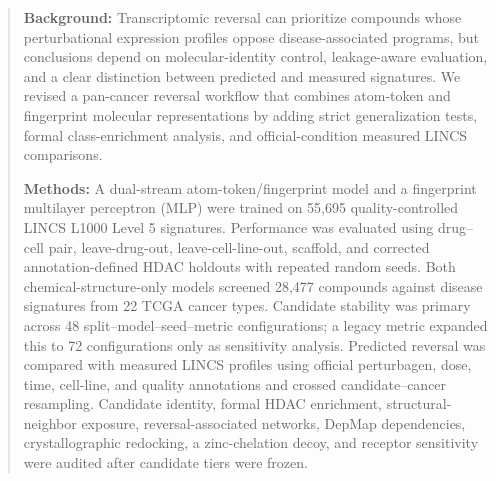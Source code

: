 
\begin{abstract}
\textbf{Background:} Transcriptomic reversal can prioritize compounds whose perturbational expression profiles oppose disease-associated programs, but conclusions depend on molecular-identity control, leakage-aware evaluation, and a clear distinction between predicted and measured signatures. We revised a pan-cancer reversal workflow that combines atom-token and fingerprint molecular representations by adding strict generalization tests, formal class-enrichment analysis, and official-condition measured LINCS comparisons.

\textbf{Methods:} A dual-stream atom-token/fingerprint model and a fingerprint multilayer perceptron (MLP) were trained on 55,695 quality-controlled LINCS L1000 Level 5 signatures. Performance was evaluated using drug--cell pair, leave-drug-out, leave-cell-line-out, scaffold, and corrected annotation-defined HDAC holdouts with repeated random seeds. Both chemical-structure-only models screened 28,477 compounds against disease signatures from 22 TCGA cancer types. Candidate stability was primary across 48 split--model--seed--metric configurations; a legacy metric expanded this to 72 configurations only as sensitivity analysis. Predicted reversal was compared with measured LINCS profiles using official perturbagen, dose, time, cell-line, and quality annotations and crossed candidate--cancer resampling. Candidate identity, formal HDAC enrichment, structural-neighbor exposure, reversal-associated networks, DepMap dependencies, crystallographic redocking, a zinc-chelation decoy, and receptor sensitivity were audited after candidate tiers were frozen.


\end{abstract}
